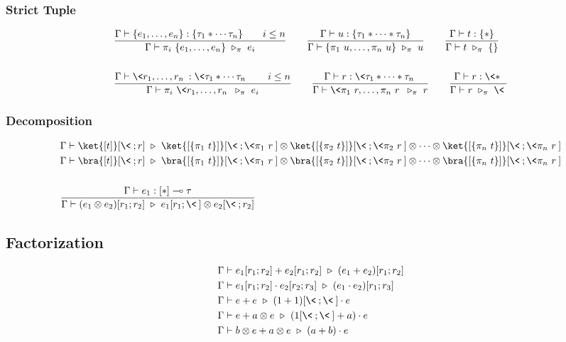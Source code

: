 \subsubsection*{Strict Tuple}

\begin{align*}
  & \frac{\Gamma \vdash \{e_1, \dots, e_n \} : \{ \tau_1 * \cdots \tau_n\}\qquad i \leq n}{\Gamma \vdash \pi_i\ \{e_1, \dots, e_n \}\ \triangleright_\pi\ e_i}
  \qquad
  \frac{\Gamma \vdash u : \{ \tau_1 * \cdots * \tau_n\}}{\Gamma \vdash \{\pi_1\ u, \dots, \pi_n\ u \}\ \triangleright_\pi\ u}
  \qquad
  \frac{\Gamma \vdash t : \{*\}}{\Gamma \vdash t\ \triangleright_\pi\ \{\}}\\
  &\ \\
  & \frac{\Gamma \vdash \<r_1, \dots, r_n \> : \< \tau_1 * \cdots \tau_n\> \qquad i \leq n}{\Gamma \vdash \pi_i\ \<r_1, \dots, r_n \>\ \triangleright_\pi\ e_i}
  \qquad
  \frac{\Gamma \vdash r : \< \tau_1 * \cdots * \tau_n\>}{\Gamma \vdash \<\pi_1\ r, \dots, \pi_n\ r \>\ \triangleright_\pi\ r}
  \qquad
  \frac{\Gamma \vdash r : \<*\>}{\Gamma \vdash r\ \triangleright_\pi\ \<\>}
\end{align*}

\subsubsection*{Decomposition}

\begin{align*}
  & \Gamma \vdash \ket{[t]}[\<\> ; r]\ \triangleright\ \ket{[\{\pi_1\ t\}]}[\<\> ; \<\pi_1\ r\>] \otimes \ket{[\{\pi_2\ t\}]}[\<\> ; \<\pi_2\ r\>] \otimes \cdots \otimes \ket{[\{\pi_n\ t\}]}[\<\> ; \<\pi_n\ r\>]\\
  & \Gamma \vdash \bra{[t]}[\<\> ; r]\ \triangleright\ \bra{[\{\pi_1\ t\}]}[\<\> ; \<\pi_1\ r\>] \otimes \bra{[\{\pi_2\ t\}]}[\<\> ; \<\pi_2\ r\>] \otimes \cdots \otimes \bra{[\{\pi_n\ t\}]}[\<\> ; \<\pi_n\ r\>]\\
  &\ \\
  &\frac{\Gamma \vdash e_1 : [*] \multimap \tau}{\Gamma \vdash (e_1 \otimes e_2)[r_1; r_2]\ \triangleright\ e_1[r_1; \<\>] \otimes e_2[\<\>; r_2]}
\end{align*}

\subsection*{Factorization}

\begin{align*}
  & \Gamma \vdash e_1[r_1; r_2] + e_2[r_1; r_2] \ \triangleright\ (e_1 + e_2)[r_1; r_2] \\
  & \Gamma \vdash e_1[r_1; r_2] \cdot e_2[r_2; r_3] \ \triangleright\ (e_1 \cdot e_2)[r_1; r_3] \\
  & \Gamma \vdash e + e \ \triangleright\ (1 + 1)[\<\>; \<\>] \cdot e \\
  & \Gamma \vdash e + a \otimes e \ \triangleright\ (1[\<\>; \<\>] + a) \cdot e \\
  & \Gamma \vdash b \otimes e + a \otimes e \ \triangleright\ (a + b) \cdot e
\end{align*}

